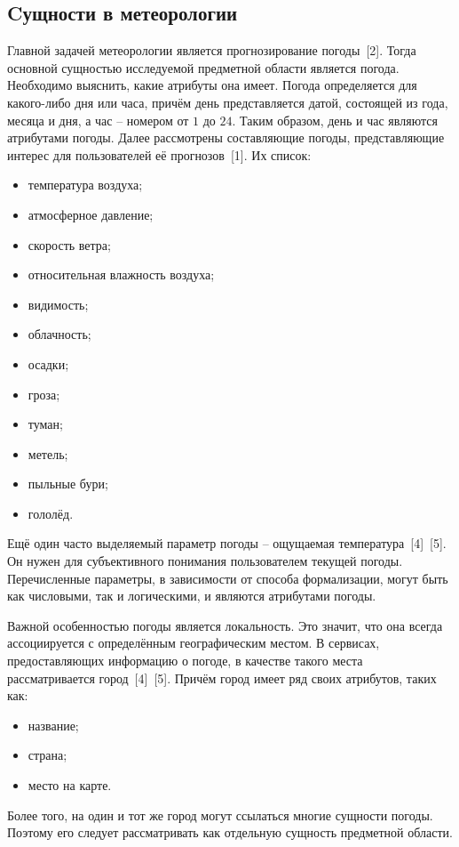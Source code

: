 \subsection{Cущности в метеорологии}
Главной задачей метеорологии является прогнозирование погоды~[2].
Тогда основной сущностью исследуемой предметной области является погода.
Необходимо выяснить, какие атрибуты она имеет.
Погода определяется для какого-либо дня или часа, причём день представляется датой, состоящей из года, месяца и дня, а час -- номером от $1$ до $24$.
Таким образом, день и час являются атрибутами погоды.
Далее рассмотрены составляющие погоды, представляющие интерес для пользователей её прогнозов~[1]. 
Их список:
\begin{itemize}
    \item температура воздуха;
    \item атмосферное давление;
    \item скорость ветра;
    \item относительная влажность воздуха;
    \item видимость;
    \item облачность;
    \item осадки;
    \item гроза;
    \item туман;
    \item метель;
    \item пыльные бури;
    \item гололёд.
\end{itemize}
Ещё один часто выделяемый параметр погоды -- ощущаемая температура~[4]~[5].
Он нужен для субъективного понимания пользователем текущей погоды.
Перечисленные параметры, в зависимости от способа формализации, могут быть как числовыми, так и логическими, и являются атрибутами погоды.

Важной особенностью погоды является локальность.
Это значит, что она всегда ассоциируется с определённым географическим местом.
В сервисах, предоставляющих информацию о погоде, в качестве такого места рассматривается город~[4]~[5].
Причём город имеет ряд своих атрибутов, таких как:
\begin{itemize}
    \item название;
    \item страна;
    \item место на карте.
\end{itemize}
Более того, на один и тот же город могут ссылаться многие сущности погоды.
Поэтому его следует рассматривать как отдельную сущность предметной области.

